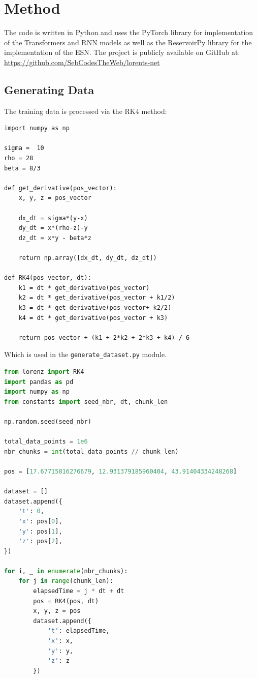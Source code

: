 \documentclass[11pt]{article}
\begin{document}
\section{Method}
The code is written in Python and uses the PyTorch library for implementation of the Transformers and RNN models as well as the ReservoirPy library for the implementation of the ESN. The project is publicly available on GitHub at: \url{https://github.com/SebCodesTheWeb/lorents-net}


\subsection{Generating Data}

The training data is processed via the RK4 method:

\begin{lstlisting}
import numpy as np

sigma =  10
rho = 28
beta = 8/3

def get_derivative(pos_vector):
    x, y, z = pos_vector

    dx_dt = sigma*(y-x)
    dy_dt = x*(rho-z)-y
    dz_dt = x*y - beta*z

    return np.array([dx_dt, dy_dt, dz_dt])

def RK4(pos_vector, dt):
    k1 = dt * get_derivative(pos_vector)
    k2 = dt * get_derivative(pos_vector + k1/2)
    k3 = dt * get_derivative(pos_vector+ k2/2)
    k4 = dt * get_derivative(pos_vector + k3)

    return pos_vector + (k1 + 2*k2 + 2*k3 + k4) / 6

\end{lstlisting}


Which is used in the \texttt{generate\_dataset.py} module.

\begin{lstlisting}[language=Python]
from lorenz import RK4
import pandas as pd
import numpy as np
from constants import seed_nbr, dt, chunk_len

np.random.seed(seed_nbr)

total_data_points = 1e6
nbr_chunks = int(total_data_points // chunk_len)

pos = [17.67715816276679, 12.931379185960404, 43.91404334248268]

dataset = []
dataset.append({
    't': 0,
    'x': pos[0],
    'y': pos[1],
    'z': pos[2],
})

for i, _ in enumerate(nbr_chunks):
    for j in range(chunk_len):
        elapsedTime = j * dt + dt
        pos = RK4(pos, dt)
        x, y, z = pos
        dataset.append({
            't': elapsedTime,
            'x': x,
            'y': y,
            'z': z
        })
\end{lstlisting}
\end{document}

